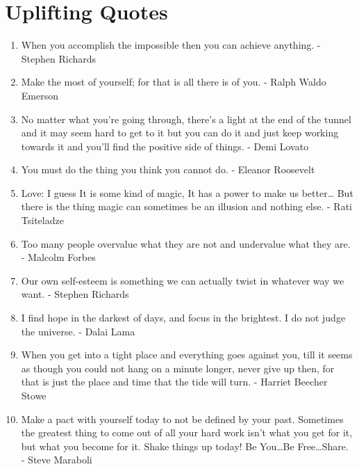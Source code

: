     \section*{Uplifting Quotes}
        \begin{enumerate}
            \item When you accomplish the impossible then you can achieve anything. - Stephen Richards

            \item Make the most of yourself; for that is all there is of you. - Ralph Waldo Emerson

            \item No matter what you’re going through, there’s a light at the end of the tunnel and it may seem hard to get to it but you can do it and just keep working towards it and you’ll find the positive side of things. - Demi Lovato

            \item You must do the thing you think you cannot do. - Eleanor Roosevelt

            \item Love: I guess It is some kind of magic, It has a power to make us better… But there is the thing magic can sometimes be an illusion and nothing else. - Rati Tsiteladze

            \item Too many people overvalue what they are not and undervalue what they are. - Malcolm Forbes

            \item Our own self-esteem is something we can actually twist in whatever way we want. - Stephen Richards

            \item I find hope in the darkest of days, and focus in the brightest. I do not judge the universe. - Dalai Lama

            \item When you get into a tight place and everything goes against you, till it seems as though you could not hang on a minute longer, never give up then, for that is just the place and time that the tide will turn. - Harriet Beecher Stowe

            \item Make a pact with yourself today to not be defined by your past. Sometimes the greatest thing to come out of all your hard work isn’t what you get for it, but what you become for it. Shake things up today! Be You…Be Free…Share. - Steve Maraboli


\end{enumerate}
